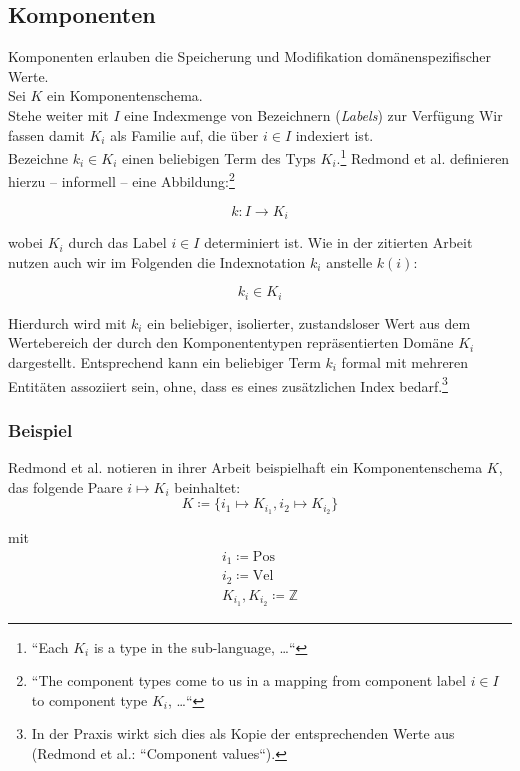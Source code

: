 \subsection{Komponenten}
Komponenten erlauben die Speicherung und Modifikation domänenspezifischer Werte.\\

\noindent
Sei $K$ ein Komponentenschema.\\

\noindent
Stehe weiter mit $I$ eine Indexmenge von Bezeichnern (\textit{Labels}) zur Verfügung
Wir fassen damit $K_i$ als Familie auf, die über $i \in I$ indexiert ist.\\

\noindent
Bezeichne $k_i \in K_i$ einen beliebigen Term des Typs $K_i$.\footnote{``Each $K_i$ is a type in the sub-language, \ldots ``}
Redmond et al. definieren hierzu -- informell -- eine Abbildung:\footnote{
    ``The component types come to us in a mapping from component label $i \in I$ to component type $K_i$, \ldots ``
}

\[
    k: I \rightarrow K_i
\]

\noindent
wobei $K_i$ durch das Label $i \in I$ determiniert ist.
Wie in der zitierten Arbeit nutzen auch wir im Folgenden die Indexnotation $k_i$ anstelle $k(i)$:

\[
    k_i \in K_i
\]

\noindent
Hierdurch wird mit $k_i$ ein beliebiger, isolierter, zustandsloser Wert aus dem Wertebereich der durch den Komponententypen repräsentierten Domäne $K_i$ dargestellt.
Entsprechend kann ein beliebiger Term $k_i$ formal mit mehreren Entitäten assoziiert sein, ohne, dass es eines zusätzlichen Index bedarf.\footnote{
    In der Praxis wirkt sich dies als Kopie der entsprechenden Werte aus (Redmond et al.: ``Component values``).
}\\

\subsubsection*{Beispiel}
Redmond et al. notieren in ihrer Arbeit beispielhaft ein Komponentenschema $K$, das folgende Paare $i \mapsto K_i$ beinhaltet:
\[
    K \coloneqq \{ i_1 \mapsto K_{i_1}, i_2 \mapsto K_{i_2} \}
\]

\noindent
mit
\[
    \begin{align}
        i_1 \coloneqq \text{Pos}\\
        i_2 \coloneqq \text{Vel}\\
        K_{i_1}, K_{i_2} \coloneq \mathbb{Z}
    \end{align}
\]

